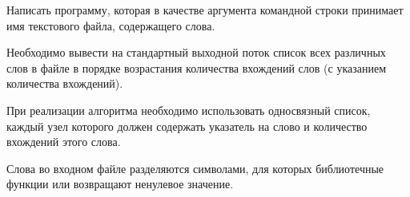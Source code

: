 

Написать программу, которая в качестве аргумента командной строки
принимает имя текстового файла, содержащего слова.

Необходимо
вывести на стандартный выходной поток список всех различных слов в
файле в порядке возрастания количества вхождений слов (с указанием
количества вхождений).

При реализации алгоритма необходимо
использовать односвязный список, каждый узел которого должен
содержать указатель на слово и количество вхождений этого слова.

Слова
во входном файле разделяются символами, для которых библиотечные
функции  или  возвращают ненулевое значение.
